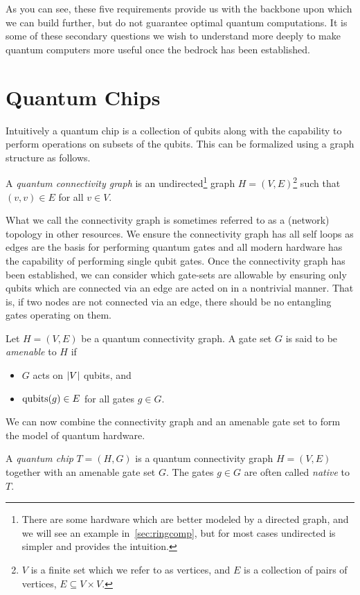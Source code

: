 As you can see, these five requirements provide us with the backbone upon which we can build further, but do not guarantee optimal quantum computations.
It is some of these secondary questions we wish to understand more deeply to make quantum computers more useful once the bedrock has been established.

\section{Quantum Chips}

Intuitively a quantum chip is a collection of qubits along with the capability to perform operations on subsets of the qubits.
This can be formalized using a graph structure as follows. %

\begin{definition}\label{def:topology}
    A \emph{quantum connectivity graph} is an undirected\footnote{There are some hardware which are better modeled by a directed graph, and we will see an example in~\cref{sec:ringcomp}, but for most cases undirected is simpler and provides the intuition.} graph $H = (V, E)$\footnote{$V$ is a finite set which we refer to as vertices, and $E$ is a collection of pairs of vertices, \ie{} $E \subseteq V \times V$.} such that $(v, v) \in E$ for all $v \in V$.
\end{definition}
What we call the connectivity graph is sometimes referred to as a (network) topology in other resources.
We ensure the connectivity graph has all self loops as edges are the basis for performing quantum gates and all modern hardware has the capability of performing single qubit gates.
Once the connectivity graph has been established, we can consider which gate-sets are allowable by ensuring only qubits which are connected via an edge are acted on in a nontrivial manner.
That is, if two nodes are not connected via an edge, there should be no entangling gates operating on them. %
\begin{definition}
    Let $H = (V, E)$ be a quantum connectivity graph.
    A gate set $G$ is said to be \emph{amenable} to $H$ if
    \begin{itemize}
        \item $G$ acts on $\abs{V}$ qubits, and
        \item $\operatorname{qubits}(g) \in E$ for all gates $g \in G$.
    \end{itemize}
\end{definition}
We can now combine the connectivity graph and an amenable gate set to form the model of quantum hardware.
\begin{definition}
    A \emph{quantum chip} $T = (H, G)$ is a quantum connectivity graph $H = (V, E)$ together with an amenable gate set $G$.
    The gates $g \in G$ are often called \emph{native} to $T$.
\end{definition}

